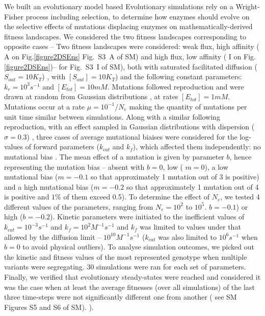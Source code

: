 \documentclass[11pt,onecolumn]{article}
\providecommand{\DIFadd}[1]{{\protect\color{blue} \sf #1}} %
\providecommand{\DIFdel}[1]{{\protect\color{red} \scriptsize #1}} %
\providecommand{\DIFaddbegin}{} %
\providecommand{\DIFaddend}{} %
\providecommand{\DIFdelbegin}{} %
\providecommand{\DIFdelend}{} %
\begin{document}
\DIFdelbegin \DIFdel{We built an evolutionary model based }\DIFdelend \DIFaddbegin \DIFadd{Evolutionary simulations rely }\DIFaddend on a Wright-Fisher process including \DIFdelbegin \DIFdel{selection, to determine how enzymes should evolve on }\DIFdelend \DIFaddbegin \DIFadd{the selective effects of mutations displacing enzymes on mathematically-derived }\DIFaddend fitness landscapes. \DIFdelbegin \DIFdel{We considered the two fitness landscapes corresponding to opposite cases -- }\DIFdelend \DIFaddbegin \DIFadd{Two fitness landscapes were considered: }\DIFaddend weak flux, high affinity (\DIFdelbegin \DIFdel{A on Fig.\ref{figure2DSEns}}\DIFdelend \DIFaddbegin \DIFadd{Fig.~S3~A of SM}\DIFaddend ) and high flux, low affinity (\DIFdelbegin \DIFdel{I on Fig.\ref{figure2DSEns})-- for }\DIFdelend \DIFaddbegin \DIFadd{Fig.~S3~I of SM), both with }\DIFaddend saturated facilitated diffusion (\DIFdelbegin \DIFdel{$S_{out}=10K_T$) , with }\DIFdelend \DIFaddbegin \DIFadd{$[S_{out}]=10K_T$) and }\DIFaddend the following constant parameters: $k_r=10^3s^{-1}$ and \DIFdelbegin \DIFdel{$[E_{tot}]=10mM$. Mutations followed reproduction and were drawn at random from Gaussian distributions , at rates }\DIFdelend \DIFaddbegin \DIFadd{$[E_{tot}]=1mM$. Mutations occur at a rate }\DIFaddend $\mu=10^{-1}/N_e$ \DIFdelbegin \DIFdel{making the quantity of mutations per unit time similar between simulations. Along with a similar }\DIFdelend \DIFaddbegin \DIFadd{following reproduction, with an effect sampled in Gaussian distributions with }\DIFaddend dispersion ($\sigma=0.3$)\DIFdelbegin \DIFdel{, three cases of average mutational biaises were considered for the log-values of forward parameters ($k_{cat}$ and $k_f$), which affected them independently: no mutational bias }\DIFdelend \DIFaddbegin \DIFadd{. The mean effect of a mutation is given by parameter $b$, hence representing the mutation bias -- absent with $b=0$, low }\DIFaddend (\DIFdelbegin \DIFdel{$m=0$), a low mutational bias ($m=-0.1$ so that approximately 1 mutation out of 3 is positive) and a high mutational bias ($m=-0.2$ so that approximately 1 mutation out of 4 is positive and $1\%$ of them exceed 0.5). To determine the effect of $N_e$, we tested 4 different values of the parameters, ranging from $N_e=10^2$ to $10^5$. }\DIFdelend \DIFaddbegin \DIFadd{$b=-0.1$) or high ($b=-0.2$). }\DIFaddend Kinetic parameters were initiated to the inefficient values of $k_{cat}=10^{-3}s^{-1}$ and $k_f=10^2M^{-1}s^{-1}$ and $k_f$ was limited to values under \DIFdelbegin \DIFdel{that allowed by }\DIFdelend the diffusion limit -- $10^{10}M^{-1}s^{-1}$ ($k_{cat}$ was also limited to $10^{6}s^{-1}$ when $b=0$ to avoid physical outliers). To analyse simulation outcomes, we picked out the kinetic and fitness values of the most represented genotype when multiple variants were segregating. 30 simulations were ran for each set of parameters. Finally, we verified that evolutionary steady-states were reached and considered it was the case when at least the average fitnesses (over all simulations) of the last three time-steps were not significantly different one from another (\DIFdelbegin \DIFdel{see }\DIFdelend \DIFaddbegin \DIFadd{SM }\DIFaddend Figures S5 and S6\DIFdelbegin \DIFdel{of SM).
}\DIFdelend \DIFaddbegin \DIFadd{).
}\DIFaddend 
\end{document}
